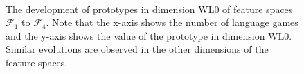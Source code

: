 \begin{figure}
\centering
{}
\\
\caption{The development of prototypes in dimension WL0 of feature spaces ${\mathcal F}_1$ to ${\mathcal F}_4$. Note that the x-axis shows the number of language games and the y-axis shows the value of the prototype in dimension WL0. Similar evolutions are observed in the other dimensions of the feature spaces.}
\label{f:cat:evol1}
\end{figure}

